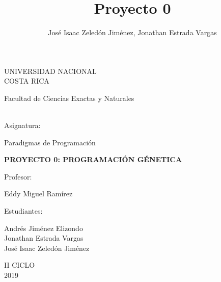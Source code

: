 \documentclass[10pt,a4paper]{article}
\author{José Isaac Zeledón Jiménez, Jonathan Estrada Vargas}
\title{Proyecto 0}
\begin{document}
\begin{titlepage}
\begin{center}
\begin{large}
UNIVERSIDAD NACIONAL\\
COSTA RICA \\
\end{large}
\vspace*{1cm}
\begin{large}
Facultad de Ciencias Exactas y Naturales
\end{large} 
\vspace*{1.8cm}\\
Asignatura:\\
\vspace*{2mm}
\begin{large}
Paradigmas de Programación\\
\end{large}
\vspace*{12mm}
\begin{large}
\textbf{PROYECTO 0: 
PROGRAMACIÓN GÉNETICA
}\\
\end{large}
\vspace*{1.8cm}
Profesor:\\
\vspace*{5mm}
\begin{large}
Eddy Miguel Ramírez\\
\end{large}
\vspace*{1.8cm}
Estudiantes: \\
\vspace*{5mm}
\begin{large}
Andrés Jiménez Elizondo\\
Jonathan Estrada Vargas\\
José Isaac Zeledón Jiménez\\
\end{large}
\vspace*{1.8cm}
II CICLO\\
\vspace*{1.8cm}
2019
\end{center}
\end{titlepage}
\tableofcontents
\pagebreak
\end{document}

